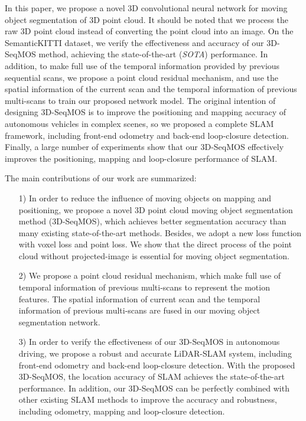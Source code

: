 \documentclass[lettersize,journal]{IEEEtran}
\begin{document}
In this paper, we propose a novel 3D convolutional neural network for moving object segmentation of 3D point cloud. It should be noted that we process the raw 3D point cloud instead of converting the point cloud into an image. On the SemanticKITTI dataset, we verify the effectiveness and accuracy of our 3D-SeqMOS method, achieving the state-of-the-art (\emph{SOTA}) performance. In addition, to make full use of the temporal information provided by previous sequential scans, we propose a point cloud residual mechanism, and use the spatial information of the current scan and the temporal information of previous multi-scans to train our proposed network model. The original intention of designing 3D-SeqMOS is to improve the positioning and mapping accuracy of autonomous vehicles in complex scenes, so we proposed a complete SLAM framework, including front-end odometry and back-end loop-closure detection. Finally, a large number of experiments show that our 3D-SeqMOS effectively improves the positioning, mapping and loop-closure performance of SLAM.

The main contributions of our work are summarized:
\begin{itemize}
\item[1)]
In order to reduce the influence of moving objects on mapping and positioning, we propose a novel 3D point cloud moving object segmentation method (3D-SeqMOS), which achieves better segmentation accuracy than many existing state-of-the-art methods. Besides, we adopt a new loss function with voxel loss and point loss. We show that the direct process of the point cloud without projected-image is essential for moving object segmentation. 

\item[2)]
We propose a point cloud residual mechanism, which make full use of temporal information of previous multi-scans to represent the motion features. The spatial information of current scan and the temporal information of previous multi-scans are fused in our moving object segmentation network.

\item[3)]
In order to verify the effectiveness of our 3D-SeqMOS in autonomous driving, we propose a robust and accurate LiDAR-SLAM system, including front-end odometry and back-end loop-closure detection. With the proposed 3D-SeqMOS, the location accuracy of SLAM achieves the state-of-the-art performance. In addition, our 3D-SeqMOS can be perfectly combined with other existing SLAM methods to improve the accuracy and robustness, including odometry, mapping and loop-closure detection.

\end{itemize}
\end{document}
